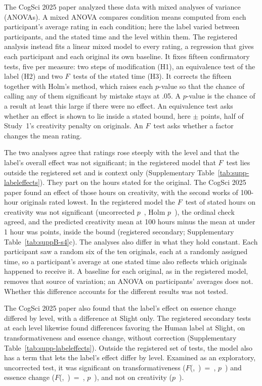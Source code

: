 The CogSci 2025 paper analyzed these data with mixed analyses of variance (ANOVAs). A mixed ANOVA compares condition means computed from each participant's average rating in each condition; here the label varied between participants, and the stated time and the level within them. The registered analysis instead fits a linear mixed model to every rating, a regression that gives each participant and each original its own baseline. It fixes fifteen confirmatory tests, five per measure: two steps of modification (H1), an equivalence test of the label (H2) and two $F$~tests of the stated time (H3). It corrects the fifteen together with Holm's method, which raises each $p$-value so that the chance of calling any of them significant by mistake stays at .05. A $p$-value is the chance of a result at least this large if there were no effect. An equivalence test asks whether an effect is shown to lie inside a stated bound, here $\pm$\SourceBound{} points, half of Study~1's creativity penalty on originals. An $F$~test asks whether a factor changes the mean rating.

The two analyses agree that ratings rose steeply with the level and that the label's overall effect was not significant; in the registered model that $F$~test lies outside the registered set and is context only (Supplementary Table~\ref{tab:supp-labeleffects}). They part on the hours stated for the original. The CogSci 2025 paper found an effect of those hours on creativity, with the second works of 100-hour originals rated lowest. In the registered model the $F$~test of stated hours on creativity was not significant (uncorrected $p$~\SFourCreatSourceTimeP, Holm $p$~\SFourCreatSourceTimePHolm), the ordinal check agreed, and the predicted creativity mean at 100 hours minus the mean at under 1 hour was \SFourCreatTimeContrastEst{} points, inside the bound (registered secondary; Supplementary Table~\ref{tab:suppB-s4}c). The analyses also differ in what they hold constant. Each participant saw a random six of the ten originals, each at a randomly assigned time, so a participant's average at one stated time also reflects which originals happened to receive it. A baseline for each original, as in the registered model, removes that source of variation; an ANOVA on participants' averages does not. Whether this difference accounts for the different results was not tested.

The CogSci 2025 paper also found that the label's effect on essence change differed by level, with a difference at Slight only. The registered secondary tests at each level likewise found differences favoring the Human label at Slight, on transformativeness and essence change, without correction (Supplementary Table~\ref{tab:supp-labeleffects}). Outside the registered set of tests, the model also has a term that lets the label's effect differ by level. Examined as an exploratory, uncorrected test, it was significant on transformativeness ($F$(\SFourTransLabelByModDfNum,~\SFourTransLabelByModDfDen)~=~\SFourTransLabelByModF, $p$~\SFourTransLabelByModP) and essence change ($F$(\SFourEssLabelByModDfNum,~\SFourEssLabelByModDfDen)~=~\SFourEssLabelByModF, $p$~\SFourEssLabelByModP), and not on creativity ($p$~\SFourCreatLabelByModP).


